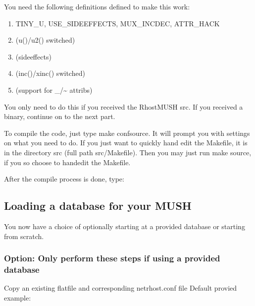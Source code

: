 \documentclass[letterpaper,10pt,english]{sphinxmanual}
\begin{document}
\sphinxAtStartPar
You need the following definitions defined to make this work:
\begin{enumerate}
%
\item {} 
\sphinxAtStartPar
TINY\_U, USE\_SIDEEFFECTS, MUX\_INCDEC, ATTR\_HACK

\item {} 
\sphinxAtStartPar
(u()/u2() switched)

\item {} 
\sphinxAtStartPar
(sideeffects)

\item {} 
\sphinxAtStartPar
(inc()/xinc() switched)

\item {} 
\sphinxAtStartPar
(support for \_/\textasciitilde{} attribs)

\end{enumerate}

\sphinxAtStartPar
You only need to do this if you received the RhostMUSH src.  If you received a binary, continue on to the next part.

\sphinxAtStartPar
To compile the code, just type \textquotesingle{}make confsource\textquotesingle{}.  It will prompt you with settings on what you need to do.  If you just want to quickly hand edit the Makefile, it is in the directory src (full path src/Makefile).  Then you may just run \textquotesingle{}make source\textquotesingle{}, if you so choose to hand\sphinxhyphen{}edit the Makefile.

\sphinxAtStartPar
After the compile process is done, type:

\begin{sphinxVerbatim}[commandchars=\\\{\}]
 
\end{sphinxVerbatim}


\subsection{Loading a database for your MUSH}
\label{\detokenize{install:loading-a-database-for-your-mush}}
\sphinxAtStartPar
You now have a choice of optionally starting at a provided database or starting from scratch.


\subsubsection{Option: Only perform these steps if using a provided database}
\label{\detokenize{install:option-only-perform-these-steps-if-using-a-provided-database}}
\sphinxAtStartPar
Copy an existing flatfile and corresponding netrhost.conf file Default provied example:
\end{document}
